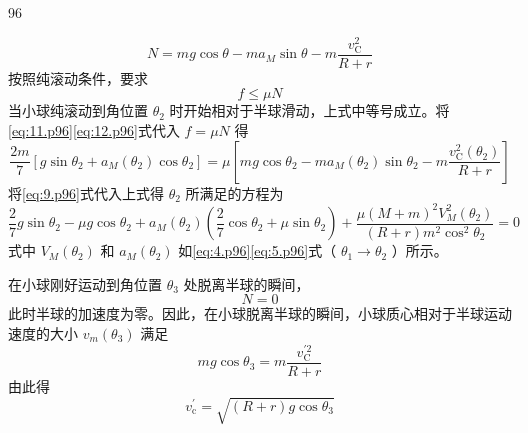 \begin{solution}{96}
\begin{subsolution}
        \begin{equation}
            N = m g \cos \theta - m a _ {M} \sin \theta - m \frac {v _ {\mathrm{C}} ^ {2}}{R + r}
            \label{eq:12.p96}
        \end{equation}
        按照纯滚动条件，要求
        \begin{equation*}
            f \leq \mu N
        \end{equation*}
        当小球纯滚动到角位置 $\theta_{2}$ 时开始相对于半球滑动，上式中等号成立。将\eqref{eq:11.p96}\eqref{eq:12.p96}式代入 $f = \mu N$ 得
        \begin{equation*}
            \frac {2 m}{7} \left[ g \sin \theta_ {2} + a _ {M} \left(\theta_ {2}\right) \cos \theta_ {2} \right] = \mu \left[ m g \cos \theta_ {2} - m a _ {M} \left(\theta_ {2}\right) \sin \theta_ {2} - m \frac {v _ {\mathrm{C}} ^ {2} \left(\theta_ {2}\right)}{R + r} \right]
        \end{equation*}
        将\eqref{eq:9.p96}式代入上式得 $\theta_{2}$ 所满足的方程为
        \begin{equation}
            \frac {2}{7} g \sin \theta_ {2} - \mu g \cos \theta_ {2} + a _ {M} (\theta_ {2}) \left(\frac {2}{7} \cos \theta_ {2} + \mu \sin \theta_ {2}\right) + \frac {\mu (M + m) ^ {2} V _ {M} ^ {2} (\theta_ {2})}{(R + r) m ^ {2} \cos^ {2} \theta_ {2}} = 0
            \label{eq:13.p96}
        \end{equation}
        式中 $V_{M}(\theta_{2})$ 和 $a_{M}(\theta_{2})$ 如\eqref{eq:4.p96}\eqref{eq:5.p96}式（ $\theta_1\to \theta_2$ ）所示。
    \end{subsolution}
    \begin{subsolution}
        在小球刚好运动到角位置 $\theta_{3}$ 处脱离半球的瞬间，
        \begin{equation}
            N = 0
            \label{eq:14.p96}
        \end{equation}
        此时半球的加速度为零。因此，在小球脱离半球的瞬间，小球质心相对于半球运动速度的大小 $v_{m}(\theta_{3})$ 满足
        \begin{equation}
            m g \cos \theta_ {3} = m \frac {v _ {\mathrm{C}} ^ {\prime 2}}{R + r}
            \label{eq:15.p96}
        \end{equation}
        由此得
        \begin{equation}
            v _ {\mathrm{c}} ^ {\prime} = \sqrt {(R + r) g \cos \theta_ {3}}
            \label{eq:16.p96}
        \end{equation}
    \end{subsolution}
\end{solution}